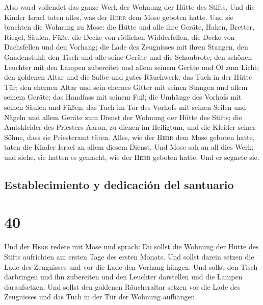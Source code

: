  Also ward vollendet das ganze Werk der Wohnung der Hütte
des Stifts. Und die Kinder Israel taten alles, was der \textsc{Herr} dem
Mose geboten hatte.  Und sie brachten die Wohnung zu
Mose: die Hütte und alle ihre Geräte, Haken, Bretter, Riegel, Säulen,
Füße,  die Decke von rötlichen Widderfellen, die Decke
von Dachsfellen und den Vorhang;  die Lade des Zeugnisses
mit ihren Stangen, den Gnadenstuhl;  den Tisch und alle
seine Geräte und die Schaubrote;  den schönen Leuchter
mit den Lampen zubereitet und allem seinem Geräte und Öl zum Licht;
 den goldenen Altar und die Salbe und gutes Räuchwerk;
das Tuch in der Hütte Tür;  den ehernen Altar und sein
ehernes Gitter mit seinen Stangen und allem seinem Geräte; das Handfass
mit seinem Fuß;  die Umhänge des Vorhofs mit seinen
Säulen und Füßen; das Tuch im Tor des Vorhofs mit seinen Seilen und
Nägeln und allem Geräte zum Dienst der Wohnung der Hütte des Stifts;
 die Amtskleider des Priesters Aaron, zu dienen im
Heiligtum, und die Kleider seiner Söhne, dass sie Priesteramt täten.
 Alles, wie der \textsc{Herr} dem Mose geboten hatte,
taten die Kinder Israel an allem diesem Dienst.  Und Mose
sah an all dies Werk; und siehe, sie hatten es gemacht, wie der
\textsc{Herr} geboten hatte. Und er segnete sie.

\hypertarget{establecimiento-y-dedicaciuxf3n-del-santuario}{%
\subsection{Establecimiento y dedicación del
santuario}\label{establecimiento-y-dedicaciuxf3n-del-santuario}}

\hypertarget{section-39}{%
\section{40}\label{section-39}}

 Und der \textsc{Herr} redete mit Mose und sprach:
 Du sollst die Wohnung der Hütte des Stifts aufrichten am
ersten Tage des ersten Monats.  Und sollst darein setzen
die Lade des Zeugnisses und vor die Lade den Vorhang hängen.
 Und sollst den Tisch darbringen und ihn zubereiten und
den Leuchter darstellen und die Lampen daraufsetzen.  Und
sollst den goldenen Räucheraltar setzen vor die Lade des Zeugnisses und
das Tuch in der Tür der Wohnung aufhängen.

